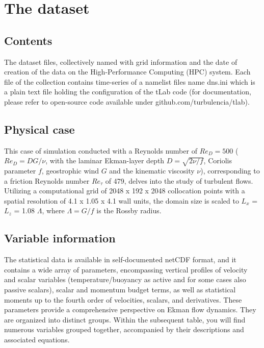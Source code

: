 \documentclass[11pt]{article}
\begin{document}
\section{The dataset}

\subsection{Contents}

The dataset files, collectively named with grid information and the date of creation of the data on the High-Performance Computing (HPC) system. Each file of the collection contains time-series of a namelist files name dns.ini which is a plain text file holding the configuration of the tLab code (for documentation, please refer to open-source code available under github.com/turbulencia/tlab). \\

\subsection{Physical case}

This case of simulation conducted with a Reynolds number of $Re_D=500$ ($Re_D=DG/\nu$, with the laminar Ekman-layer depth $D=\sqrt{2\nu/ f}$, Coriolis parameter $f$, geostrophic wind $G$ and the kinematic viscosity $\nu$), corresponding to a friction Reynolds number \(Re_{\tau}\) of 479, delves into the study of turbulent flows. Utilizing a computational grid of 2048 x 192 x 2048 collocation points with a spatial resolution of 4.1 x 1.05 x 4.1 wall units, the domain size is scaled to \(L_x\) = \(L_z\) = 1.08 \(\Lambda\), where \(\Lambda=G/f\) is the Rossby radius. \\

\subsection{Variable information}

The statistical data is available in self-documented netCDF format, and it contains a wide array of parameters, encompassing vertical profiles of velocity and scalar variables (temperature/buoyancy as active and for some cases also passive scalars), scalar and momentum budget terms, as well as statistical moments up to the fourth order of velocities, scalars, and derivatives. These parameters provide a comprehensive perspective on Ekman flow dynamics. They are organized into distinct groups. Within the subsequent table, you will find numerous variables grouped together, accompanied by their descriptions and associated equations.
\end{document}
